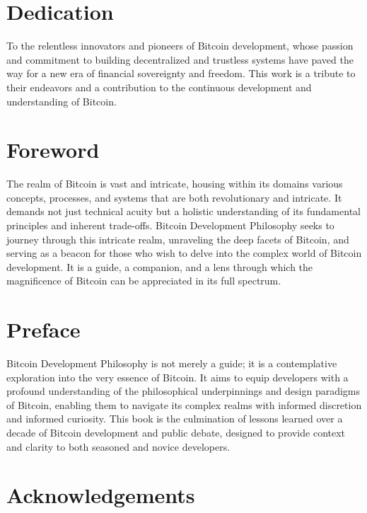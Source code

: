 \hypertarget{dedication}{%
\section{Dedication}\label{dedication}}

To the relentless innovators and pioneers of Bitcoin development, whose
passion and commitment to building decentralized and trustless systems
have paved the way for a new era of financial sovereignty and freedom.
This work is a tribute to their endeavors and a contribution to the
continuous development and understanding of Bitcoin.

\hypertarget{foreword}{%
\section{Foreword}\label{foreword}}

The realm of Bitcoin is vast and intricate, housing within its domains
various concepts, processes, and systems that are both revolutionary and
intricate. It demands not just technical acuity but a holistic
understanding of its fundamental principles and inherent trade-offs.
Bitcoin Development Philosophy seeks to journey through this intricate
realm, unraveling the deep facets of Bitcoin, and serving as a beacon
for those who wish to delve into the complex world of Bitcoin
development. It is a guide, a companion, and a lens through which the
magnificence of Bitcoin can be appreciated in its full spectrum.

\hypertarget{preface}{%
\section{Preface}\label{preface}}

Bitcoin Development Philosophy is not merely a guide; it is a
contemplative exploration into the very essence of Bitcoin. It aims to
equip developers with a profound understanding of the philosophical
underpinnings and design paradigms of Bitcoin, enabling them to navigate
its complex realms with informed discretion and informed curiosity. This
book is the culmination of lessons learned over a decade of Bitcoin
development and public debate, designed to provide context and clarity
to both seasoned and novice developers.

\hypertarget{acknowledgements}{%
\section{Acknowledgements}\label{acknowledgements}}


